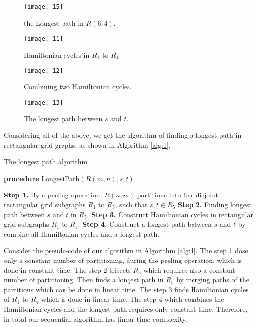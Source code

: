 \documentclass[preprint,12pt]{elsarticle}
\begin{document}
\begin{figure}[htb]
  \centering
  \texttt{[image: 15]}
  \caption[]{\small the Longest path in $R(6,4)$.}
  \label{cd1}
\end{figure}

\begin{figure}[htb]
  \centering
  \texttt{[image: 11]}
  \caption[]{\small Hamiltonian cycles in $R_1$ to $R_4$.}
  \label{cd}
\end{figure}

\begin{figure}[htb]
  \centering
  \texttt{[image: 12]}
  \caption[]{\small Combining two Hamiltonian cycles.}
  \label{cm}
\end{figure}

\begin{figure}[htb]
  \centering
  \texttt{[image: 13]}
  \caption[]{\small The longest path between $s$ and $t$.}
  \label{cn}
\end{figure}

Considering all of the above, we get the algorithm of finding a
longest path in rectangular grid graphs, as shown in Algorithm
\ref{alg:1}.
\newcommand{\LET}{\STATE \textbf{let }}
\newcommand{\SET}{\STATE \textbf{set }}
\newcommand{\PROC}{\STATE \textbf{procedure }}
\newcommand{\RET}{\STATE \textbf{return }}
\begin{algorithm}
\caption{The longest path algorithm} \label{alg:1}
\begin{algorithmic}
\PROC LongestPath$(R(m,n),s,t)$
\end{algorithmic}
\begin{algorithmic}
{\small \STATE \textbf{Step 1.} By a peeling operation, $R(n,m)$
partitions into five disjoint rectangular grid subgraphs $R_{1}$ to
$R_{5}$, such that $s,t\in R_{5}$ \STATE \textbf{Step 2.} Finding
longest path between $s$ and $t$ in $R_{5}$. \STATE \textbf{Step 3.} Construct Hamiltonian cycles in rectangular
grid subgraphs $R_{1}$ to $R_{4}$.
 \STATE \textbf{Step 4.} Construct a longest
path between $s$ and $t$ by combine all Hamiltonian cycles and a
longest path.}
\end{algorithmic}
\end{algorithm}

Consider the pseudo-code of our algorithm in Algorithm \ref{alg:1}.
The step 1 dose only a constant number of partitioning, during the
peeling operation, which is done in constant time. The step 2
trisects $R_5$ which requires also a constant number of
partitioning. Then finds a longest path in $R_5$ by merging paths of
the partitions which can be done in linear time. The step 3 finds
Hamiltonian cycles of $R_1$ to $R_4$ which is done in linear time.
The step 4 which combines the Hamiltonian cycles and the longest
path requires only constant time. Therefore, in total our sequential
algorithm has linear-time complexity.
\end{document}
